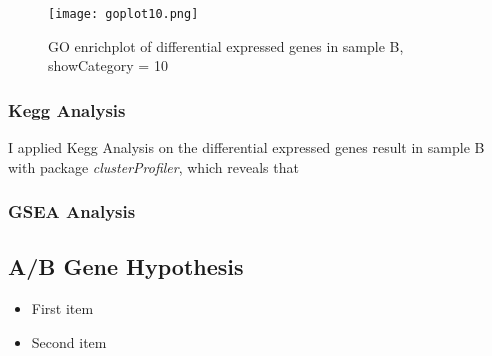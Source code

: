 \documentclass[fleqn,10pt]{wlscirep}
\begin{document}
\begin{figure}[ht]
    \centering
    \texttt{[image: goplot10.png]}
    \caption{GO enrichplot of differential expressed genes in sample B, showCategory = 10}
    \label{fig:stream}
    \end{figure}


\subsubsection*{Kegg Analysis}
I applied Kegg Analysis on the differential expressed genes result in sample B with package \textit{clusterProfiler}\cite{yu2012clusterprofiler}, which reveals that 

\subsubsection{GSEA Analysis}

\subsection*{A/B Gene Hypothesis}

\begin{itemize}
\item First item
\item Second item
\end{itemize}



\end{document}
